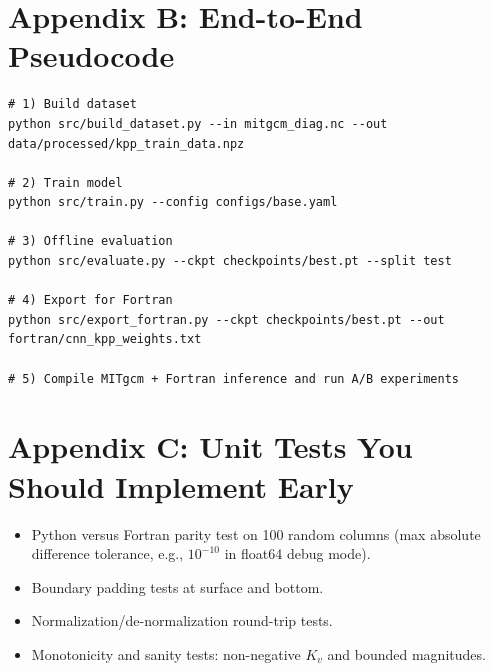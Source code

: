 \documentclass[11pt, a4paper]{article}
\begin{document}
\section*{Appendix B: End-to-End Pseudocode}

\begin{verbatim}
# 1) Build dataset
python src/build_dataset.py --in mitgcm_diag.nc --out data/processed/kpp_train_data.npz

# 2) Train model
python src/train.py --config configs/base.yaml

# 3) Offline evaluation
python src/evaluate.py --ckpt checkpoints/best.pt --split test

# 4) Export for Fortran
python src/export_fortran.py --ckpt checkpoints/best.pt --out fortran/cnn_kpp_weights.txt

# 5) Compile MITgcm + Fortran inference and run A/B experiments
\end{verbatim}

\section*{Appendix C: Unit Tests You Should Implement Early}

\begin{itemize}
    \item Python versus Fortran parity test on 100 random columns (max absolute difference tolerance, e.g., $10^{-10}$ in float64 debug mode).
    \item Boundary padding tests at surface and bottom.
    \item Normalization/de-normalization round-trip tests.
    \item Monotonicity and sanity tests: non-negative $K_v$ and bounded magnitudes.
\end{itemize}
\end{document}
